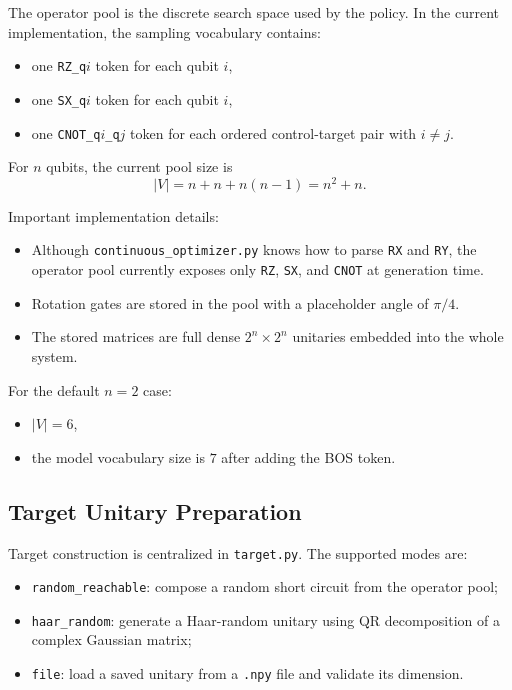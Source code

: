 \documentclass[11pt]{article}
\begin{document}
The operator pool is the discrete search space used by the policy. In the current implementation, the sampling vocabulary contains:

\begin{itemize}[leftmargin=*]
\item one \texttt{RZ\_q$i$} token for each qubit $i$,
\item one \texttt{SX\_q$i$} token for each qubit $i$,
\item one \texttt{CNOT\_q$i$\_q$j$} token for each ordered control-target pair with $i \neq j$.
\end{itemize}

For $n$ qubits, the current pool size is
\[
|V| = n + n + n(n - 1) = n^2 + n.
\]

Important implementation details:

\begin{itemize}[leftmargin=*]
\item Although \texttt{continuous\_optimizer.py} knows how to parse \texttt{RX} and \texttt{RY}, the operator pool currently exposes only \texttt{RZ}, \texttt{SX}, and \texttt{CNOT} at generation time.
\item Rotation gates are stored in the pool with a placeholder angle of $\pi/4$.
\item The stored matrices are full dense $2^n \times 2^n$ unitaries embedded into the whole system.
\end{itemize}

For the default $n=2$ case:

\begin{itemize}[leftmargin=*]
\item $|V| = 6$,
\item the model vocabulary size is $7$ after adding the BOS token.
\end{itemize}

\subsection{Target Unitary Preparation}

Target construction is centralized in \texttt{target.py}. The supported modes are:

\begin{itemize}[leftmargin=*]
\item \texttt{random\_reachable}: compose a random short circuit from the operator pool;
\item \texttt{haar\_random}: generate a Haar-random unitary using QR decomposition of a complex Gaussian matrix;
\item \texttt{file}: load a saved unitary from a \texttt{.npy} file and validate its dimension.
\end{itemize}
\end{document}
